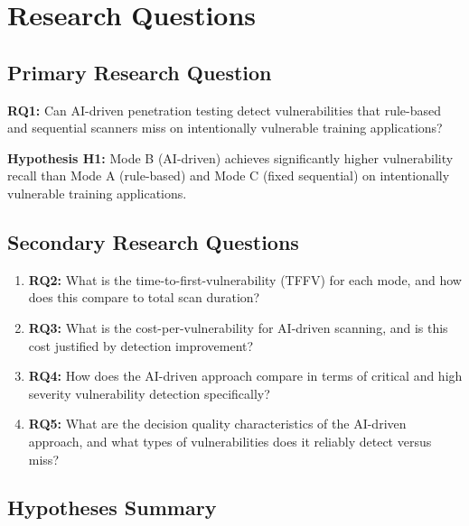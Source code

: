 \documentclass[12pt,a4paper,oneside]{book}
\begin{document}
\chapter{Research Questions}

\section{Primary Research Question}

\textbf{RQ1:} Can AI-driven penetration testing detect vulnerabilities that rule-based and sequential scanners miss on intentionally vulnerable training applications?

\textbf{Hypothesis H1:} Mode B (AI-driven) achieves significantly higher vulnerability recall than Mode A (rule-based) and Mode C (fixed sequential) on intentionally vulnerable training applications.

\section{Secondary Research Questions}

\begin{enumerate}
    \item \textbf{RQ2:} What is the time-to-first-vulnerability (TFFV) for each mode, and how does this compare to total scan duration?
    \item \textbf{RQ3:} What is the cost-per-vulnerability for AI-driven scanning, and is this cost justified by detection improvement?
    \item \textbf{RQ4:} How does the AI-driven approach compare in terms of critical and high severity vulnerability detection specifically?
    \item \textbf{RQ5:} What are the decision quality characteristics of the AI-driven approach, and what types of vulnerabilities does it reliably detect versus miss?
\end{enumerate}

\section{Hypotheses Summary}
\end{document}

